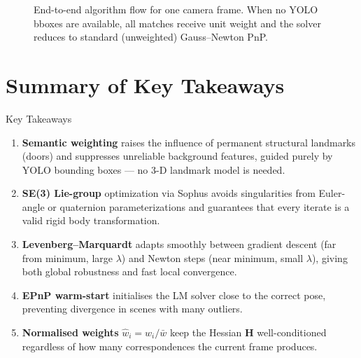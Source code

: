 \documentclass[12pt,a4paper]{article}
\begin{document}
\begin{figure}[H]
\caption{End-to-end algorithm flow for one camera frame. When no YOLO bboxes are
         available, all matches receive unit weight and the solver reduces to
         standard (unweighted) Gauss--Newton PnP.}
\label{fig:flowchart}
\end{figure}

\section*{Summary of Key Takeaways}

\begin{definitionbox}{Key Takeaways}
\begin{enumerate}[noitemsep, leftmargin=1.2em]
  \item \textbf{Semantic weighting} raises the influence of permanent structural
        landmarks (doors) and suppresses unreliable background features, guided
        purely by YOLO bounding boxes --- no 3-D landmark model is needed.

  \item \textbf{SE(3) Lie-group} optimization via Sophus avoids singularities from
        Euler-angle or quaternion parameterizations and guarantees that every iterate
        is a valid rigid body transformation.

  \item \textbf{Levenberg--Marquardt} adapts smoothly between gradient descent (far
        from minimum, large $\lambda$) and Newton steps (near minimum, small $\lambda$),
        giving both global robustness and fast local convergence.

  \item \textbf{EPnP warm-start} initialises the LM solver close to the correct pose,
        preventing divergence in scenes with many outliers.

  \item \textbf{Normalised weights} $\hat{w}_i = w_i/\bar{w}$ keep the Hessian
        $\mathbf{H}$ well-conditioned regardless of how many correspondences the
        current frame produces.
\end{enumerate}
\end{definitionbox}
\end{document}
